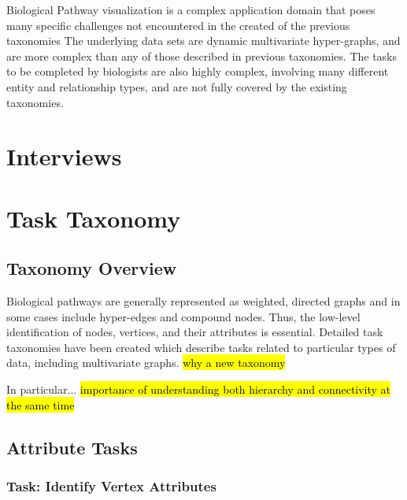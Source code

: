 \documentclass{egpubl}
\begin{document}

Biological Pathway visualization is a complex application domain that poses many specific challenges not encountered in the created of the previous taxonomies
The underlying data sets are dynamic multivariate hyper-graphs, and are more complex than any of those described in previous taxonomies.
The tasks to be completed by biologists are also highly complex, involving many different entity and relationship types, and are not fully covered by the existing taxonomies.


\section{Interviews}

\section{Task Taxonomy}

\subsection{Taxonomy Overview}

Biological pathways are generally represented as weighted, directed graphs and in some cases include hyper-edges and compound nodes.
Thus, the low-level identification of nodes, vertices, and their attributes is essential.
Detailed task taxonomies have been created which describe tasks related to particular types of data, including multivariate graphs.
\hl{why a new taxonomy}

In particular...
\hl{importance of understanding both hierarchy and connectivity at the same time}

\subsection{Attribute Tasks}
\subsubsection{Task: Identify Vertex Attributes}
\end{document}
